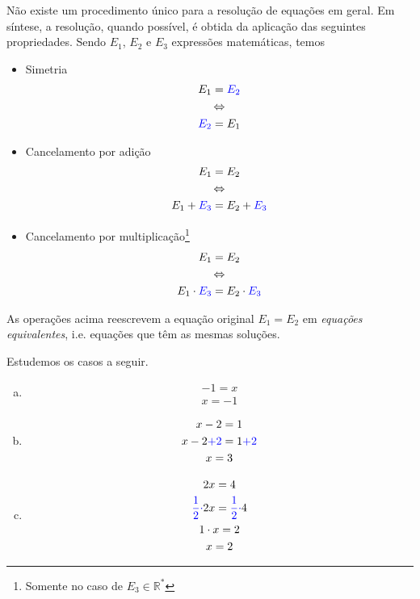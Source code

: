 Não existe um procedimento único para a resolução de equações em geral. Em síntese, a resolução, quando possível, é obtida da aplicação das seguintes propriedades. Sendo $E_1$, $E_2$ e $E_3$ expressões matemáticas, temos
\begin{itemize}
\item Simetria
  \begin{equation}
    \begin{gathered}
      E_1 = {\color{blue}E_2} \\
      \Leftrightarrow \\
      {\color{blue}E_2} = E_1
    \end{gathered}
\end{equation}
\item Cancelamento por adição
  \begin{equation}
    \begin{gathered}
      E_1 = E_2 \\
      \Leftrightarrow \\
      E_1 + {\color{blue}E_3} = E_2 + {\color{blue}E_3}
  \end{gathered}
\end{equation}
\item Cancelamento por multiplicação\footnote{Somente no caso de $E_3\in\mathbb{R}^*$}
  \begin{equation}
    \begin{gathered}
      E_1 = E_2 \\
      \Leftrightarrow \\
      E_1\cdot {\color{blue}E_3} = E_2 \cdot {\color{blue}E_3}
  \end{gathered}
  \end{equation}
\end{itemize}

As operações acima reescrevem a equação original $E_1 = E_2$ em \emph{equações equivalentes}, i.e. equações que têm as mesmas soluções.

\begin{ex}
  Estudemos os casos a seguir.
  \begin{enumerate}[a)]
  \item
    \begin{gather}
      -1 = x\\
      x = -1
    \end{gather}
  \item
    \begin{gather}
      x - 2 = 1\\
      x - 2 {\color{blue}+ 2} = 1 {\color{blue}+ 2}\\
      x = 3
    \end{gather}
  \item
    \begin{gather}
      2x = 4\\
      {\color{blue}\frac{1}{2}\cdot}2x = {\color{blue}\frac{1}{2}\cdot}4\\
      1\cdot x = 2\\
      x = 2
    \end{gather}
  \end{enumerate}
\end{ex}

